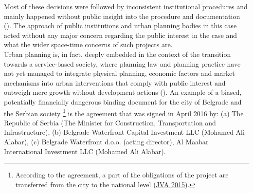 \documentclass[11pt]{report}
\begin{document}
Most of these decisions were followed by inconsistent institutional procedures and mainly happened without public insight into the procedure and documentation (\href{Izvestaj}{\citealt{pravni_skener_alternativni_2016}}).
The approach of public institutions and urban planning bodies in this case acted without any major concern regarding the public interest in the case and what the wider space-time concerns of such projects are.
\\

Urban planning is, in fact, deeply embedded in the context of the transition towards a service-based society, where planning law and planning practice have not yet managed to integrate physical planning, economic factors and market mechanisms into urban interventions that comply with public interest and outweigh mere growth without development actions  (\href{Vujosevic}{\citealt{vujosevic_collapse_2010}}).
An example of a biased, potentially financially dangerous binding document for the city of Belgrade and the Serbian society
\footnote{
According to the agreement, a part of the obligations of the project are transferred from the city to the national level (\href{ref}{JVA 2015}).}
is the agreement that was signed in April 2016 by:
(a) The Republic of Serbia (The Minister for Construction, Transportation and Infrastructure),
(b) Belgrade Waterfront Capital Investment LLC (Mohamed Ali Alabar),
(c) Belgrade Waterfront d.o.o. (acting director),
Al Maabar International Investment LLC (Mohamed Ali Alabar).
\\
\end{document}

